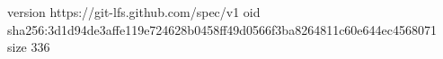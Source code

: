 version https://git-lfs.github.com/spec/v1
oid sha256:3d1d94de3affe119e724628b0458ff49d0566f3ba8264811c60e644ec4568071
size 336
